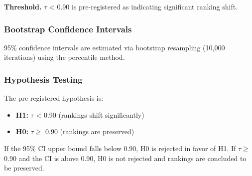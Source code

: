 \textbf{Threshold.} $\tau$ < 0.90 is pre-registered as indicating significant ranking shift.

\subsubsection{Bootstrap Confidence Intervals}

95\% confidence intervals are estimated via bootstrap resampling (10,000 iterations) using the percentile method.

\subsubsection{Hypothesis Testing}

The pre-registered hypothesis is:

\begin{itemize}
\item \textbf{H1:} $\tau$ < 0.90 (rankings shift significantly)
\item \textbf{H0:} $\tau \geq$ 0.90 (rankings are preserved)
\end{itemize}

If the 95\% CI upper bound falls below 0.90, H0 is rejected in favor of H1. If $\tau \geq$ 0.90 and the CI is above 0.90, H0 is not rejected and rankings are concluded to be preserved.

